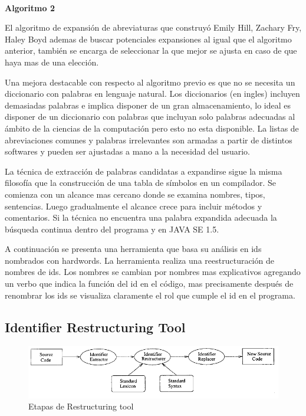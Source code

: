 \documentclass[12pt]{report}
\begin{document}
\noindent \textbf{\\Algoritmo 2}

El algoritmo de expansión de abreviaturas que construyó Emily Hill, Zachary Fry, Haley Boyd ademas de buscar potenciales expansiones al igual que el algoritmo anterior, también se encarga de seleccionar la que mejor se ajusta en caso de que haya mas de una elección\cite{EZH08}.

Una mejora destacable con respecto al algoritmo previo es que no se necesita un diccionario con palabras en lenguaje natural. Los diccionarios (en ingles) incluyen demasiadas palabras e implica disponer de un gran almacenamiento, lo ideal es disponer de un diccionario con palabras que incluyan solo palabras adecuadas al ámbito de la ciencias de la computación pero esto no esta disponible. La listas de abreviaciones comunes y palabras irrelevantes son armadas a partir de distintos softwares y pueden ser ajustadas a mano a la necesidad del usuario.

La técnica de extracción de palabras candidatas a expandirse sigue la misma filosofía que la construcción de una tabla de símbolos en un compilador.
Se comienza con un alcance mas cercano donde se examina nombres, tipos, sentencias. Luego gradualmente el alcance crece para incluir métodos y comentarios. Si la técnica no encuentra una palabra expandida adecuada la búsqueda continua dentro del programa y en JAVA SE 1.5.




A continuación se presenta una herramienta que basa su análisis en ids nombrados con hardwords. La herramienta realiza una reestructuración de nombres de ids. Los nombres se cambian por nombres mas explicativos agregando un verbo que indica la función del id en el código, mas precisamente después de renombrar los ids se visualiza claramente el rol que cumple el id en el programa.


\pagebreak 
\subsection{Identifier Restructuring Tool}

\begin{figure}[h] %
\centering
\includegraphics[scale= 0.80]{./ire_1.png}
\caption{Etapas de Restructuring tool}
\label{ire1}
\end{figure}
\end{document}
